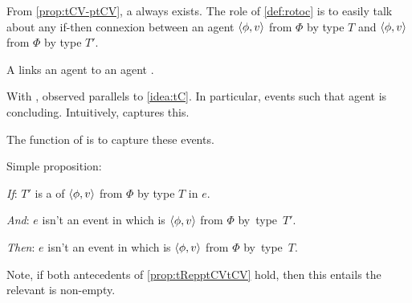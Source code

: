 \begin{note}
  \noindent%
  From \autoref{prop:tCV-ptCV}, a \tRep{} always exists.
  The role of \autoref{def:rotoc} is to easily talk about any if-then connexion between an agent \tCV{} \(\langle \phi, v \rangle\) from \(\Phi\) by type \(T\) and \ptCV{} \(\langle \phi, v \rangle\) from \(\Phi\) by type \(T'\).
\end{note}

\begin{note}
  A \rotoc{} links an agent \ptCV{} to an agent \tCV{}.

  With \ptCV{}, observed parallels to \autoref{idea:tC}.
  In particular, events such that agent is concluding.
  Intuitively, \rotoc{} captures this.

  The function of \rotoc{} is to capture these events.
\end{note}

\begin{note}
  Simple proposition:

  \begin{proposition}
    \label{prop:tRepptCVtCV}

    \noindent%
    \begin{itenum}
    \item[\emph{If}:]
      \(T'\) is a \tRep{} of \vAgent{} \tCV{} \(\langle \phi, v \rangle\) from \(\Phi\) by type \(T\) in \(e\).
    \item[\emph{And}:]
      \(e\) isn't an event in which \vAgent{} is  \(\langle \phi, v \rangle\) from \(\Phi\) by~type~\(T'\).
    \item[\emph{Then}:]
      \(e\) isn't an event in which \vAgent{} is  \(\langle \phi, v \rangle\) from \(\Phi\) by~type~\(T\).
    \end{itenum}
    \vspace{-.5\baselineskip}
  \end{proposition}

  \noindent%
  Note, if both antecedents of \autoref{prop:tRepptCVtCV} hold, then this entails the relevant \tRep{} is non-empty.
\end{note}

